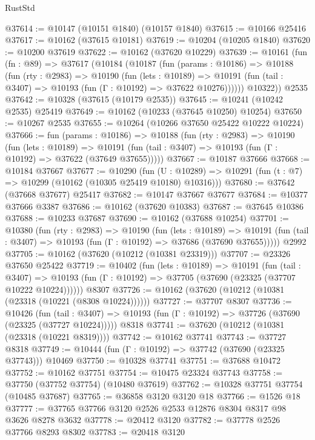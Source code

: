 \begin{lexlean}{RustStd}
\begin{coremodule}
@37614 := @10147 (@10151 @1840) (@10157 @1840)
@37615 := @10166 @25416
@37617 := @10162 (@37615 @10181)
@37619 := @10204 (@10205 @1840)
@37620 := @10200 @37619
@37622 := @10162 (@37620 @10229)
@37639 := @10161
    (fun (fn : @89) =>
    @37617
      (@10184
        (@10187
          (fun (params : @10186) =>
          @10188
            (fun (rty : @2983) =>
            @10190
              (fun (lets : @10189) =>
              @10191 (fun (tail : @3407) => @10193 (fun (Γ : @10192) => @37622 @10276))))))
        @10322))
    @2535
@37642 := @10328 (@37615 (@10179 @2535))
@37645 := @10241 (@10242 @2535) @25419
@37649 := @10162 (@10233 (@37645 @10250) @10254)
@37650 := @10267 @2535
@37655 := @10264 (@10266 @37650 @25422 @10222 @10224)
@37666 := fun (params : @10186) =>
  @10188
    (fun (rty : @2983) =>
    @10190
      (fun (lets : @10189) =>
      @10191 (fun (tail : @3407) => @10193 (fun (Γ : @10192) => @37622 (@37649 @37655)))))
@37667 := @10187 @37666
@37668 := @10184 @37667
@37677 := @10290
    (fun (U : @10289) => @10291 (fun (t : @7) => @10299 (@10162 (@10305 @25419 @10180) @10316)))
@37680 := @37642 (@37668 @37677) @25417
@37682 := @10147 @37667 @37677
@37684 := @10377 @37666 @3387
@37686 := @10162 (@37620 @10383)
@37687 := @37645 @10386
@37688 := @10233 @37687
@37690 := @10162 (@37688 @10254)
@37701 := @10380
    (fun (rty : @2983) =>
    @10190
      (fun (lets : @10189) =>
      @10191 (fun (tail : @3407) => @10193 (fun (Γ : @10192) => @37686 (@37690 @37655)))))
    @2992
@37705 := @10162 (@37620 (@10212 (@10381 @23319)))
@37707 := @23326 @37650 @25422
@37719 := @10402
    (fun (lets : @10189) =>
    @10191
      (fun (tail : @3407) =>
      @10193 (fun (Γ : @10192) => @37705 (@37690 (@23325 (@37707 @10222 @10224))))))
    @8307
@37726 := @10162 (@37620 (@10212 (@10381 (@23318 (@10221 (@8308 @10224))))))
@37727 := @37707 @8307
@37736 := @10426
    (fun (tail : @3407) => @10193 (fun (Γ : @10192) => @37726 (@37690 (@23325 (@37727 @10224)))))
    @8318
@37741 := @37620 (@10212 (@10381 (@23318 (@10221 @8319))))
@37742 := @10162 @37741
@37743 := @37727 @8318
@37749 := @10444 (fun (Γ : @10192) => @37742 (@37690 (@23325 @37743))) @10469
@37750 := @10328 @37741
@37751 := @37688 @10472
@37752 := @10162 @37751
@37754 := @10475 @23324 @37743
@37758 := @37750 (@37752 @37754) (@10480 @37619)
@37762 := @10328 @37751 @37754 (@10485 @37687)
@37765 := @36858 @3120 @3120 @18
@37766 := @1526 @18
@37777 := @37765 @37766 @3120 @2526 @2533 @12876 @8304 @8317 @98 @3626 @8278 @3632
@37778 := @20412 @3120
@37782 := @37778 @2526 @37766 @8293 @8302
@37783 := @20418 @3120

\end{coremodule}
\end{lexlean}
